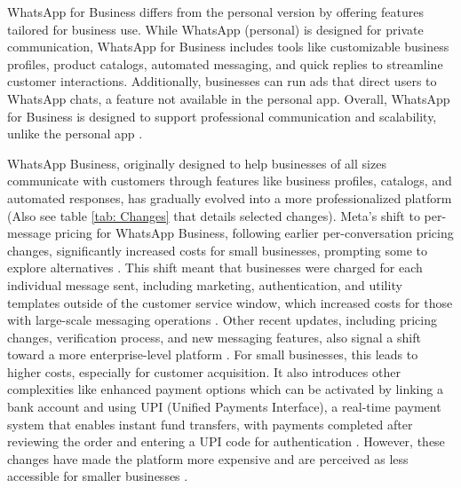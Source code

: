 WhatsApp for Business differs from the personal version by offering features tailored for business use. While WhatsApp (personal) is designed for private communication, WhatsApp for Business includes tools like customizable business profiles, product catalogs, automated messaging, and quick replies to streamline customer interactions. Additionally, businesses can run ads that direct users to WhatsApp chats, a feature not available in the personal app. Overall, WhatsApp for Business is designed to support professional communication and scalability, unlike the personal app \cite{WhatsAppPricing2024}.


WhatsApp Business, originally designed to help businesses of all sizes communicate with customers through features like business profiles, catalogs, and automated responses, has gradually evolved into a more professionalized platform \cite{whatsappforbusiness} (Also see table \ref{tab: Changes} that details selected changes). Meta's shift to per-message pricing for WhatsApp Business, following earlier per-conversation pricing changes, significantly increased costs for small businesses, prompting some to explore alternatives \cite{10.1145/3613905.3651034}. This shift meant that businesses were charged for each individual message sent, including marketing, authentication, and utility templates outside of the customer service window, which increased costs for those with large-scale messaging operations \cite{cornish2023whatsapp}. Other recent updates, including pricing changes, verification process, and new messaging features, also signal a shift toward a more enterprise-level platform \cite{WhatsAppPricing2024}. For small businesses, this leads to higher costs, especially for customer acquisition. It also introduces other complexities like enhanced payment options which can be activated by linking a bank account and using UPI (Unified Payments Interface), a real-time payment system that enables instant fund transfers, with payments completed after reviewing the order and entering a UPI code for authentication \cite{whatsapp_payment_guide_2024}. However, these changes have made the platform more expensive and are perceived as less accessible for smaller businesses \cite{10.1145/3613905.3651034}.



